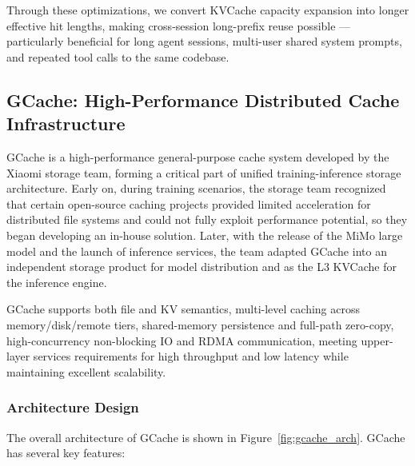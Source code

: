 Through these optimizations, we convert KVCache capacity expansion into longer effective hit lengths, making cross-session long-prefix reuse possible --- particularly beneficial for long agent sessions, multi-user shared system prompts, and repeated tool calls to the same codebase.

\subsection{GCache: High-Performance Distributed Cache Infrastructure}

GCache is a high-performance general-purpose cache system developed by the Xiaomi storage team, forming a critical part of unified training-inference storage architecture. Early on, during training scenarios, the storage team recognized that certain open-source caching projects provided limited acceleration for distributed file systems and could not fully exploit performance potential, so they began developing an in-house solution. Later, with the release of the MiMo large model and the launch of inference services, the team adapted GCache into an independent storage product for model distribution and as the L3 KVCache for the inference engine.

GCache supports both file and KV semantics, multi-level caching across memory/disk/remote tiers, shared-memory persistence and full-path zero-copy, high-concurrency non-blocking IO and RDMA communication, meeting upper-layer services requirements for high throughput and low latency while maintaining excellent scalability.

\subsubsection{Architecture Design}

The overall architecture of GCache is shown in Figure~\ref{fig:gcache_arch}. GCache has several key features:

